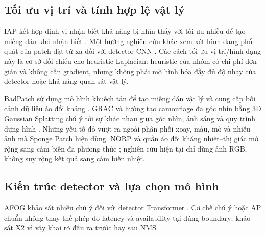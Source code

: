 \documentclass[a4paper,fleqn]{cas-dc}
\newif\ifbranchB
\begin{document}
\subsection{Tối ưu vị trí và tính hợp lệ vật lý}

IAP kết hợp định vị nhận biết khả năng bị nhìn thấy với tối ưu nhiễu để tạo miếng dán khó nhận biết \cite{iap2025}. Một hướng nghiên cứu khác xem xét hình dạng phổ quát của patch đặt từ xa đối với detector CNN \cite{remoteshape2025}. Các cách tối ưu vị trí/hình dạng này là cơ sở đối chiếu cho heuristic Laplacian: heuristic của nhóm có chi phí đơn giản và không cần gradient, nhưng không phải mô hình hóa đầy đủ độ nhạy của detector hoặc khả năng quan sát vật lý.

BadPatch sử dụng mô hình khuếch tán để tạo miếng dán vật lý và cung cấp bối cảnh dữ liệu áo đối kháng \cite{badpatch2025}. GRAC và hướng tạo camouflage đa góc nhìn bằng 3D Gaussian Splatting chú ý tới sự khác nhau giữa góc nhìn, ánh sáng và quy trình dựng hình \cite{grac2025,3dgs2025}. Những yếu tố đó vượt ra ngoài phân phối xoay, màu, mờ và nhiễu ảnh mà Sponge Patch hiện dùng. NORP và quần áo đối kháng nhiệt--thị giác mở rộng sang cảm biến đa phương thức \cite{norp2026,thermalcloth2026}; nghiên cứu hiện tại chỉ dùng ảnh RGB, không suy rộng kết quả sang cảm biến nhiệt.

\subsection{Kiến trúc detector và lựa chọn mô hình}

\ifbranchB
YOLOv12 tổ chức detector theo hướng chú ý để cân bằng biểu diễn và tốc độ, trong khi YOLOv13 dùng HyperACE và FullPAD để tăng tương tác đặc trưng giữa vị trí và thang đo \cite{yolo12_2025,yolo13_2025}. AFOG khảo sát nhiễu chú ý đối với detector Transformer, cho thấy cơ chế chú ý không tự tạo ra tính an toàn trước đầu vào đối kháng \cite{afog2025}. Vì vậy, giảm FLOPs hoặc tăng AP trên benchmark chuẩn không thay thế việc đo latency và kiểm tra tính sẵn sàng trong đường ống cụ thể.

Các số liệu COCO công bố của YOLOv13 và số đo person một lớp của nhóm được đặt cạnh nhau ở phần thực nghiệm bổ sung. Mục đích là nhìn rõ thay đổi thứ hạng và điều kiện, không đánh giá ưu thế bằng cách lấy hai metric khác giao thức trừ nhau. Bài này sử dụng kiến trúc có sẵn; đóng góp ở nhánh detector là tổ chức và phân tích thực nghiệm theo ngân sách, không phải phát minh HyperACE hay FullPAD.
\fi
AFOG khảo sát nhiễu chú ý đối với detector Transformer \cite{afog2025}. Cơ chế chú ý hoặc AP chuẩn không thay thế phép đo latency và availability tại đúng boundary; khảo sát X2 vì vậy khai rõ đầu ra trước hay sau NMS.
\end{document}
